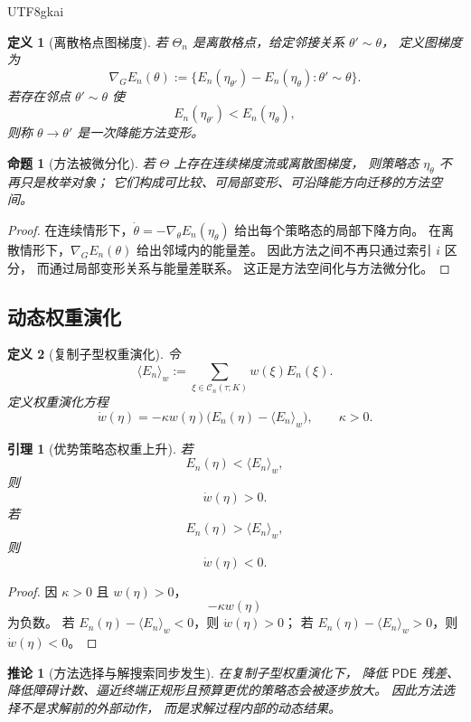 \documentclass[12pt]{article}
\newtheorem{definition}{定义}[section]
\newtheorem{proposition}{命题}[section]
\newtheorem{corollary}{推论}[section]
\newtheorem{lemma}{引理}[section]
\newcommand{\PDE}{\mathsf{PDE}}
\begin{document}
\begin{CJK*}{UTF8}{gkai}
\begin{definition}[离散格点图梯度]
若 \(\Theta_n\) 是离散格点，给定邻接关系 \(\theta'\sim\theta\)，
定义图梯度为
\[
  \nabla_G E_n(\theta)
  :=
  \{E_n(\eta_{\theta'})-E_n(\eta_\theta):\theta'\sim\theta\}.
\]
若存在邻点 \(\theta'\sim\theta\) 使
\[
  E_n(\eta_{\theta'})<E_n(\eta_\theta),
\]
则称 \(\theta\to\theta'\) 是一次降能方法变形。
\end{definition}

\begin{proposition}[方法被微分化]
\label{prop:tex53-method-differentiated}
若 \(\Theta\) 上存在连续梯度流或离散图梯度，
则策略态 \(\eta_\theta\) 不再只是枚举对象；
它们构成可比较、可局部变形、可沿降能方向迁移的方法空间。
\end{proposition}

\begin{proof}
在连续情形下，\(\dot\theta=-\nabla_\theta E_n(\eta_\theta)\) 给出每个策略态的局部下降方向。
在离散情形下，\(\nabla_G E_n(\theta)\) 给出邻域内的能量差。
因此方法之间不再只通过索引 \(i\) 区分，
而通过局部变形关系与能量差联系。
这正是方法空间化与方法微分化。
\end{proof}

\subsection{动态权重演化}
\label{subsec:tex53-weight-flow}

\begin{definition}[复制子型权重演化]
令
\[
  \langle E_n\rangle_w
  :=
  \sum_{\xi\in\mathcal C_n(\tau;K)}
  w(\xi)E_n(\xi).
\]
定义权重演化方程
\[
  \dot w(\eta)
  =
  -\kappa w(\eta)
  \bigl(E_n(\eta)-\langle E_n\rangle_w\bigr),
  \qquad
  \kappa>0.
\]
\end{definition}

\begin{lemma}[优势策略态权重上升]
\label{lem:tex53-replicator}
若
\[
  E_n(\eta)<\langle E_n\rangle_w,
\]
则
\[
  \dot w(\eta)>0.
\]
若
\[
  E_n(\eta)>\langle E_n\rangle_w,
\]
则
\[
  \dot w(\eta)<0.
\]
\end{lemma}

\begin{proof}
因 \(\kappa>0\) 且 \(w(\eta)>0\)，
\[
  -\kappa w(\eta)
\]
为负数。
若 \(E_n(\eta)-\langle E_n\rangle_w<0\)，则 \(\dot w(\eta)>0\)；
若 \(E_n(\eta)-\langle E_n\rangle_w>0\)，则 \(\dot w(\eta)<0\)。
\end{proof}

\begin{corollary}[方法选择与解搜索同步发生]
在复制子型权重演化下，
降低 \(\PDE\) 残差、降低障碍计数、逼近终端正规形且预算更优的策略态会被逐步放大。
因此方法选择不是求解前的外部动作，
而是求解过程内部的动态结果。
\end{corollary}


\end{CJK*}
\end{document}
